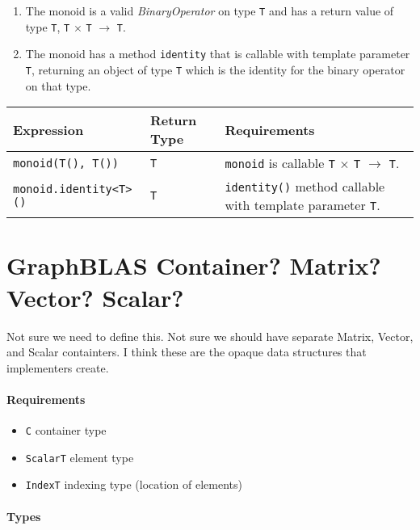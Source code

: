 \begin{enumerate}
   \item The monoid is a valid \textit{BinaryOperator} on type \texttt{T} and has a return value of type \texttt{T}, \texttt{T} $\times$ \texttt{T} $\rightarrow$ \texttt{T}.
   \item The monoid has a method \texttt{identity} that is callable with template parameter \texttt{T}, returning an object of type \texttt{T} which is the identity for the binary operator on that type.
\end{enumerate}

\begin{tabularx}{\textwidth}{l l X}
\textbf{Expression} & \textbf{Return Type} & \textbf{Requirements}\\
\hline
\texttt{monoid(T(), T())} & \texttt{T} & \texttt{monoid} is callable \texttt{T} $\times$ \texttt{T} $\rightarrow$ \texttt{T}.\\
\hline
\texttt{monoid.identity<T>()} & \texttt{T} & \texttt{identity()} method callable with template parameter \texttt{T}.\\
\end{tabularx}

\section{GraphBLAS Container? Matrix? Vector? Scalar?}

Not sure we need to define this.  Not sure we should have separate Matrix, Vector, 
and Scalar containters. I think these are the opaque data structures that implementers create.


\paragraph{Requirements}
\begin{itemize} \itemsep0em
\item \texttt{C} container type
\item \texttt{ScalarT} element type
\item \texttt{IndexT} indexing type (location of elements)
\end{itemize}

\paragraph{Types}

